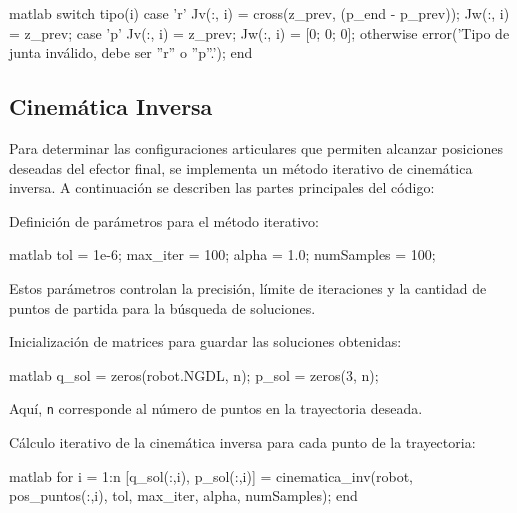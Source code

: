 \begin{matlabcode}{matlab}
	switch tipo(i)
	case 'r'
	Jv(:, i) = cross(z_prev, (p_end - p_prev));
	Jw(:, i) = z_prev;
	case 'p'
	Jv(:, i) = z_prev;
	Jw(:, i) = [0; 0; 0];
	otherwise
	error('Tipo de junta inválido, debe ser ''r'' o ''p''.');
	end
\end{matlabcode}

\subsection{Cinemática Inversa}

Para determinar las configuraciones articulares que permiten alcanzar posiciones deseadas del efector final, se implementa un método iterativo de cinemática inversa. A continuación se describen las partes principales del código:

\bigskip

Definición de parámetros para el método iterativo:

\begin{matlabcode}{matlab}
	tol = 1e-6;         %
	max_iter = 100;     %
	alpha = 1.0;        %
	numSamples = 100;   %
\end{matlabcode}

Estos parámetros controlan la precisión, límite de iteraciones y la cantidad de puntos de partida para la búsqueda de soluciones.

\bigskip

Inicialización de matrices para guardar las soluciones obtenidas:

\begin{matlabcode}{matlab}
	q_sol = zeros(robot.NGDL, n);   %
	p_sol = zeros(3, n);            %
\end{matlabcode}

Aquí, \texttt{n} corresponde al número de puntos en la trayectoria deseada.

\bigskip

Cálculo iterativo de la cinemática inversa para cada punto de la trayectoria:

\begin{matlabcode}{matlab}
	for i = 1:n
	[q_sol(:,i), p_sol(:,i)] = cinematica_inv(robot, pos_puntos(:,i), tol, max_iter, alpha, numSamples);
	end
\end{matlabcode}

